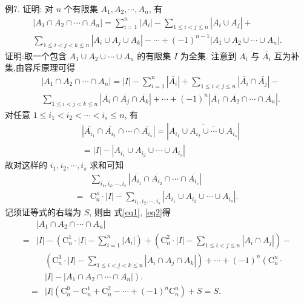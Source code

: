 例7. 证明: 对 $n$ 个有限集 $A_1, A_2, \cdots, A_n$, 有
$$
\begin{gathered}
\left|A_1 \cap A_2 \cap \cdots \cap A_n\right|=\sum_{i=1}^n\left|A_i\right|-\sum_{1 \leqslant i<j \leqslant n}\left|A_i \cup A_j\right|+ \\
\sum_{1 \leqslant i<j<k \leqslant n}\left|A_i \cup A_j \cup A_k\right|-\cdots+(-1)^{n-1}\left|A_1 \cup A_2 \cup \cdots \cup A_n\right| .
\end{gathered}
$$
证明:取一个包含 $A_1 \cup A_2 \cup \cdots \cup A_n$ 的有限集 $I$ 为全集.
注意到 $A_i$ 与 $\overline{A_i}$ 互为补集,由容斥原理可得
$$
\begin{aligned}
& \left|A_1 \cap A_2 \cap \cdots \cap A_n\right|=|I|-\sum_{i=1}^n\left|\overline{A_i}\right|+\sum_{1 \leqslant i<j \leqslant n}\left|\overline{A_i} \cap \overline{A_j}\right|- \\
& \sum_{1 \leqslant i<j<k \leqslant n}\left|\overline{A_i} \cap \overline{A_j} \cap \overline{A_k}\right|+\cdots+(-1)^n\left|\overline{A_1} \cap \overline{A_2} \cap \cdots \cap \overline{A_n}\right| . \label{eq1}
\end{aligned}
$$
对任意 $1 \leqslant i_1<i_2<\cdots<i_s \leqslant n$, 有
$$
\begin{aligned}
& \left|\overline{A_{i_1}} \cap \overline{A_{i_2}} \cap \cdots \cap \overline{A_{i_s}}\right|=\left|\overline{A_{i_1} \cup \overline{A_{i_2} \cup \cdots \cup A_{i_s}}}\right| \\
& =|I|-\left|A_{i_1} \cup A_{i_2} \cup \cdots \cup A_{i_s}\right|  
\end{aligned}
$$
故对这样的 $i_1, i_2, \cdots, i_s$ 求和可知
$$
\begin{aligned}
& \sum_{i_1, i_2, \cdots, i_s}\left|\overline{A_{i_1}} \cap \overline{A_{i_2}} \cap \cdots \cap \overline{A_{i_s}}\right| \\
= & \mathrm{C}_n^s \cdot|I|-\sum_{i_1, i_2, \cdots, i_s}\left|A_{i_1} \cup A_{i_2} \cup \cdots \cup A_{i_s}\right| . \label{eq2}
\end{aligned}
$$
记须证等式的右端为 $S$, 则由 式\ref{eq1}, \ref{eq2}得
$$
\begin{aligned}
& \left|A_1 \cap A_2 \cap \cdots \cap A_n\right| \\
= & |I|-\left(\mathrm{C}_n^1 \cdot|I|-\sum_{i=1}^n\left|A_i\right|\right)+\left(\mathrm{C}_n^2 \cdot|I|-\sum_{1 \leqslant i<j \leqslant n}\left|A_i \cap A_j\right|\right)-
\end{aligned}
$$
$$
\begin{aligned}
& \left(\mathrm{C}_n^3 \cdot|I|-\sum_{1 \leqslant i<j<k \leqslant n}\left|A_i \cap A_j \cap A_k\right|\right)+\cdots+(-1)^n\left(\mathrm{C}_n^n \cdot\right. \\
& \left.|I|-\left|A_1 \cap A_2 \cap \cdots \cap A_n\right|\right) . \\
= & |I|\left(\mathrm{C}_n^0-\mathrm{C}_n^1+\mathrm{C}_n^2-\cdots+(-1)^n \mathrm{C}_n^n\right)+S=S .
\end{aligned}
$$
